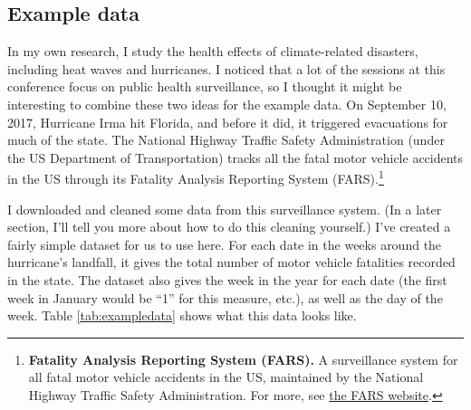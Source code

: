\documentclass[]{tufte-book}
\begin{document}
\hypertarget{example-data}{%
\subsection{Example data}\label{example-data}}

In my own research, I study the health effects of climate-related disasters, including
heat waves and hurricanes. I noticed that a lot of the sessions at this conference
focus on public health surveillance, so I thought it might be interesting to combine
these two ideas for the example data. On September 10, 2017, Hurricane Irma hit Florida,
and before it did, it triggered evacuations for much of the state. The National Highway
Traffic Safety Administration (under the US Department of Transportation) tracks all
the fatal motor vehicle accidents in the US through its Fatality Analysis Reporting
System (FARS).\footnote{\textbf{Fatality Analysis Reporting System (FARS).} A surveillance system
  for all fatal motor vehicle accidents in the US, maintained by the National Highway
  Traffic Safety Administration. For more, see
  \href{https://www.nhtsa.gov/research-data/fatality-analysis-reporting-system-fars}{the FARS website}.}

I downloaded and cleaned some data from this surveillance system. (In a later section,
I'll tell you more about how to do this cleaning yourself.) I've created a fairly
simple dataset for us to use here. For each date in the weeks around the hurricane's
landfall, it gives the total number of motor vehicle fatalities recorded in the
state. The dataset also gives the week in the year for each date (the first week in
January would be ``1'' for this measure, etc.), as well as the day of the week.
Table \ref{tab:exampledata} shows what this data looks like.
\end{document}

